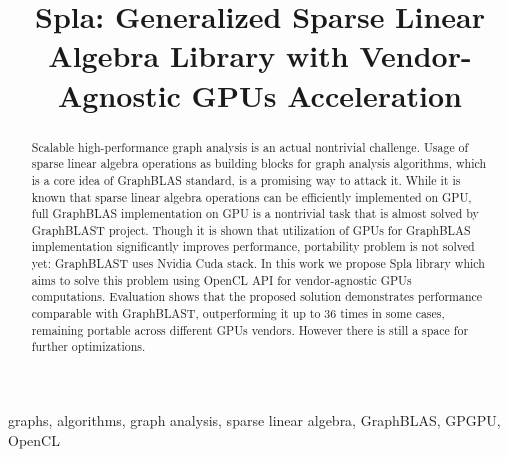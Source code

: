 \documentclass[conference]{IEEEtran}
\begin{document}
\title{Spla: Generalized Sparse Linear Algebra Library with Vendor-Agnostic GPUs Acceleration}

\author{
\and
{}
}

\maketitle

\begin{abstract}
    Scalable high-performance graph analysis is an actual nontrivial challenge. Usage of sparse linear algebra operations as building blocks for graph analysis algorithms, which is a core idea of GraphBLAS standard, is a promising way to attack it.
    While it is known that sparse linear algebra operations can be efficiently implemented on GPU, full GraphBLAS implementation on GPU is a nontrivial task that is almost solved by GraphBLAST project. Though it is shown that utilization of GPUs for GraphBLAS implementation significantly improves performance, portability problem is not solved yet: GraphBLAST uses Nvidia Cuda stack.
    In this work we propose Spla library which aims to solve this problem using OpenCL API for vendor-agnostic GPUs computations.
    Evaluation shows that the proposed solution demonstrates performance comparable with GraphBLAST, outperforming it up to 36 times in some cases, remaining portable across different GPUs vendors. However there is still a space for further optimizations.
\end{abstract}

\begin{IEEEkeywords}
graphs, algorithms, graph analysis, sparse linear algebra, GraphBLAS, GPGPU, OpenCL
\end{IEEEkeywords}








\end{document}
